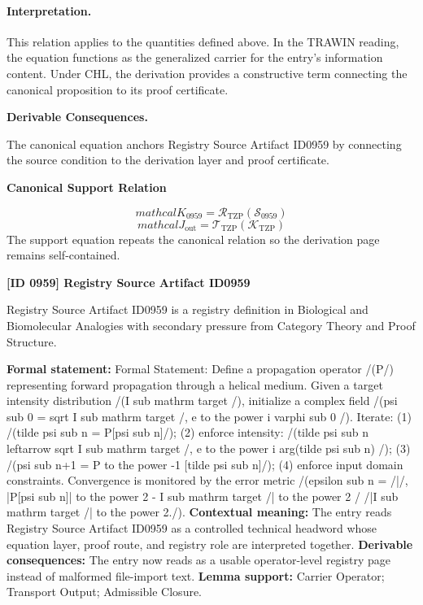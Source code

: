 \paragraph{Interpretation.}
This relation applies to the quantities defined above. In the TRAWIN reading, the equation functions as the generalized carrier for the entry’s information content. Under CHL, the derivation provides a constructive term connecting the canonical proposition to its proof certificate.

\par\vspace{0.35em}
\noindent\textbf{Derivable Consequences.}\quad
\begingroup
\footnotesize
\raggedright
The canonical equation anchors Registry Source Artifact ID0959 by connecting the source condition to the derivation layer and proof certificate.
\par\endgroup

\noindent\textbf{Canonical Support Relation}\par
\[
mathcal{K}_{0959}=\mathcal{R}_{\mathrm{TZP}}\!\left(\mathcal{S}_{0959}\right)
\]
\[
mathcal{J}_{\mathrm{out}} = \mathcal{T}_{\mathrm{TZP}}\!\left(\mathcal{K}_{\mathrm{TZP}}\right)
\]
\noindent The support equation repeats the canonical relation so the derivation page remains self-contained.\par

\clearpage
\noindent\textbf{[ID 0959] Registry Source Artifact ID0959}\par
\vspace{0.35em}
\begingroup\small
{}
Registry Source Artifact ID0959 is a registry definition in Biological and Biomolecular Analogies with secondary pressure from Category Theory and Proof Structure.

\begingroup\footnotesize\setlength{\emergencystretch}{3em}\sloppy
\textbf{Formal statement:} Formal Statement: Define a propagation operator /(P/) representing forward propagation through a helical medium. Given a target intensity distribution /(I sub mathrm target /), initialize a complex field /(psi sub 0 = sqrt I sub mathrm target /, e to the power i varphi sub 0 /). Iterate: (1) /(tilde psi sub n = P[psi sub n]/); (2) enforce intensity: /(tilde psi sub n leftarrow sqrt I sub mathrm target /, e to the power i arg(tilde psi sub n) /); (3) /(psi sub n+1 = P to the power -1 [tilde psi sub n]/); (4) enforce input domain constraints. Convergence is monitored by the error metric /(epsilon sub n = /|/, |P[psi sub n]| to the power 2 - I sub mathrm target /| to the power 2 / /|I sub mathrm target /| to the power 2./). \textbf{Contextual meaning:} The entry reads Registry Source Artifact ID0959 as a controlled technical headword whose equation layer, proof route, and registry role are interpreted together. \textbf{Derivable consequences:} The entry now reads as a usable operator-level registry page instead of malformed file-import text. \textbf{Lemma support:} Carrier Operator; Transport Output; Admissible Closure.\par
\endgroup

